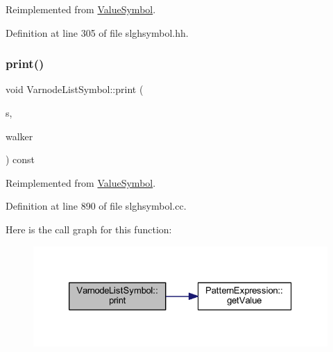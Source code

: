 Reimplemented from \mbox{\hyperlink{class_value_symbol_aa134aca647315ca414f6e4e4a246c9ae}{Value\+Symbol}}.



Definition at line 305 of file slghsymbol.\+hh.

\mbox{\label{class_varnode_list_symbol_a3dbd47d58a39197a6126fec8a0b11be4}} 
\subsubsection{\texorpdfstring{print()}{print()}}
{\footnotesize\ttfamily void Varnode\+List\+Symbol\+::print (\begin{DoxyParamCaption}\item[{ostream \&}]{s,  }\item[{\mbox{\hyperlink{class_parser_walker}{Parser\+Walker}} \&}]{walker }\end{DoxyParamCaption}) const\hspace{0.3cm}{\ttfamily [virtual]}}



Reimplemented from \mbox{\hyperlink{class_value_symbol_a82b3d3fbfc6d3ed118103f12220cdfd4}{Value\+Symbol}}.



Definition at line 890 of file slghsymbol.\+cc.

Here is the call graph for this function\+:
\nopagebreak
\begin{figure}[H]
\begin{center}
\leavevmode
\includegraphics[width=326pt]{class_varnode_list_symbol_a3dbd47d58a39197a6126fec8a0b11be4_cgraph}
\end{center}
\end{figure}
\mbox{\label{class_varnode_list_symbol_a6757d4ecc0f1844adf14b8370835602a}} 
